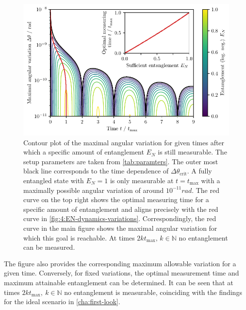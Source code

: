 \begin{figure}[!htbp]
  \centering
  \includegraphics[width=\textwidth]{./../figures/theta-variance/time-delta-theta-crit-EN.pdf}
  \caption{Contour plot of the maximal angular variation for given times after which a specific amount of entanglement $E_N$ is still measurable. The setup parameters are taken from \cref{tab:paramters}. The outer most black line corresponds to the time dependence of $\Delta \theta_\mathrm{crit}$. A fully entangled state with $E_N=1$ is only measurable at $t=t_\mathrm{max}$ with a maximally possible angular variation of around $10^{-11}\si{rad}$. The red curve on the top right shows the optimal measuring time for a specific amount of entanglement and aligns precisely with the red curve in \cref{fig:4:EN-dynamics-variations}. Correspondingly, the red curve in the main figure shows the maximal angular variation for which this goal is reachable. At times $2k t_\mathrm{max},\,k\in\mathbb{N}$ no entanglement can be measured.}
  \label{fig:4:time-delta-theta}
\end{figure}
The figure also provides the corresponding maximum allowable variation for a given time. Conversely, for fixed variations, the optimal measurement time and maximum attainable entanglement can be determined.
It can be seen that at times $2k t_\mathrm{max}, \ k\in\mathbb{N}$ no entanglement is measurable, coinciding with the findings for the ideal scenario in \cref{cha:first-look}. 
